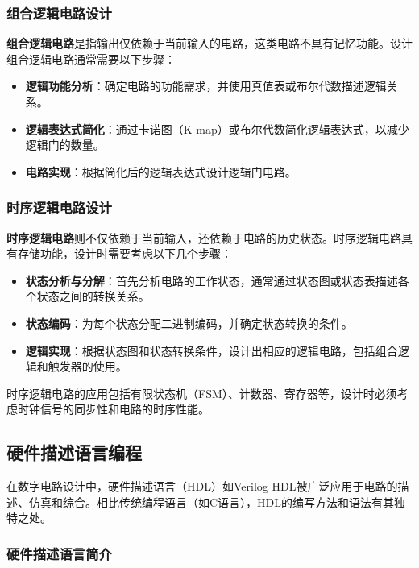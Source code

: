 \subsubsection{组合逻辑电路设计}\label{sec:03-digital-logic-016}

\textbf{组合逻辑电路}是指输出仅依赖于当前输入的电路，这类电路不具有记忆功能。设计组合逻辑电路通常需要以下步骤：

\begin{itemize}
\tightlist
\item
  \textbf{逻辑功能分析}：确定电路的功能需求，并使用真值表或布尔代数描述逻辑关系。
\item
  \textbf{逻辑表达式简化}：通过卡诺图（K-map）或布尔代数简化逻辑表达式，以减少逻辑门的数量。
\item
  \textbf{电路实现}：根据简化后的逻辑表达式设计逻辑门电路。
\end{itemize}

\subsubsection{时序逻辑电路设计}\label{sec:03-digital-logic-017}

\textbf{时序逻辑电路}则不仅依赖于当前输入，还依赖于电路的历史状态。时序逻辑电路具有存储功能，设计时需要考虑以下几个步骤：

\begin{itemize}
\tightlist
\item
  \textbf{状态分析与分解}：首先分析电路的工作状态，通常通过状态图或状态表描述各个状态之间的转换关系。
\item
  \textbf{状态编码}：为每个状态分配二进制编码，并确定状态转换的条件。
\item
  \textbf{逻辑实现}：根据状态图和状态转换条件，设计出相应的逻辑电路，包括组合逻辑和触发器的使用。
\end{itemize}

时序逻辑电路的应用包括有限状态机（FSM）、计数器、寄存器等，设计时必须考虑时钟信号的同步性和电路的时序性能。

\subsection{硬件描述语言编程}\label{sec:03-digital-logic-018}

在数字电路设计中，硬件描述语言（HDL）如Verilog HDL被广泛应用于电路的描述、仿真和综合。相比传统编程语言（如C语言），HDL的编写方法和语法有其独特之处。

\subsubsection{硬件描述语言简介}\label{sec:03-digital-logic-019}

